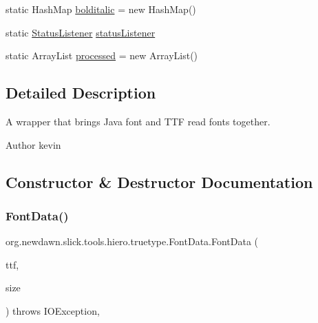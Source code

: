 \begin{DoxyCompactItemize}
\item 
static Hash\+Map \mbox{\hyperlink{classorg_1_1newdawn_1_1slick_1_1tools_1_1hiero_1_1truetype_1_1_font_data_a16536b4022d7f501f3e0c8be8621ccaf}{bolditalic}} = new Hash\+Map()
\item 
static \mbox{\hyperlink{interfaceorg_1_1newdawn_1_1slick_1_1tools_1_1hiero_1_1truetype_1_1_status_listener}{Status\+Listener}} \mbox{\hyperlink{classorg_1_1newdawn_1_1slick_1_1tools_1_1hiero_1_1truetype_1_1_font_data_aa1e117e156dc915030130f6e37336246}{status\+Listener}}
\item 
static Array\+List \mbox{\hyperlink{classorg_1_1newdawn_1_1slick_1_1tools_1_1hiero_1_1truetype_1_1_font_data_ac41bafa7d1178a87a42d524448f191a9}{processed}} = new Array\+List()
\end{DoxyCompactItemize}


\subsection{Detailed Description}
A wrapper that brings Java font and T\+TF read fonts together.

\begin{DoxyAuthor}{Author}
kevin 
\end{DoxyAuthor}


\subsection{Constructor \& Destructor Documentation}
\mbox{\label{classorg_1_1newdawn_1_1slick_1_1tools_1_1hiero_1_1truetype_1_1_font_data_a0cc2d7c13aa1457a3b8853dbbe0936e4}} 
\subsubsection{\texorpdfstring{Font\+Data()}{FontData()}\hspace{0.1cm}{\footnotesize\ttfamily [1/2]}}
{\footnotesize\ttfamily org.\+newdawn.\+slick.\+tools.\+hiero.\+truetype.\+Font\+Data.\+Font\+Data (\begin{DoxyParamCaption}\item[{Input\+Stream}]{ttf,  }\item[{float}]{size }\end{DoxyParamCaption}) throws I\+O\+Exception\hspace{0.3cm}{\ttfamily [inline]}, {\ttfamily [private]}}

